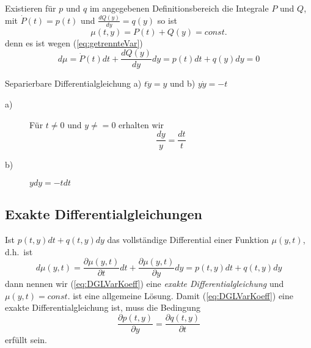 Existieren für $p$ und $q$ im angegebenen Definitionsbereich die Integrale $P$
und $Q$, mit $\dot{P}(t)=p(t)$ und $\frac{dQ(y)}{dy}=q(y)$ so ist
\[\mu(t,y)=P(t)+Q(y)=const.\]
denn es ist wegen (\ref{eq:getrennteVar})
\[ d\mu=\dot{P}(t)dt+\frac{dQ(y)}{dy}dy=p(t)dt+q(y)dy=0\]
\begin{example}{Separierbare Differentialgleichung}
a) $t\dot{y}=y$ und b) $y\dot{y}=-t$
\begin{description}
  \item[a)] Für $t\ne 0$ und $y\ne =0$ erhalten wir 
  \[\frac{dy}{y}=\frac{dt}{t}\]
\item[b)] $ydy=-tdt$
\end{description}
\end{example}
\subsection{Exakte Differentialgleichungen}
Ist $p(t,y)dt+q(t,y)dy$ das vollständige Differential einer Funktion
$\mu(y,t)$, d.h.\ ist 
\[d\mu(y,t)=\frac{\partial\mu(y,t)}{\partial t}dt+
\frac{\partial\mu(y,t)}{\partial y}dy=p(t,y)dt+q(t,y)dy\]
dann nennen wir (\ref{eq:DGLVarKoeff}) eine {\it exakte Differentialgleichung}
und $\mu(y,t)=const.$ ist eine allgemeine Lösung. Damit (\ref{eq:DGLVarKoeff})
eine exakte Differentialgleichung ist, muss die Bedingung
\begin{equation}
  \frac{\partial p(t,y)}{\partial y}=  \frac{\partial q(t,y)}{\partial t}
  \label{eq:BedExaktheit}
\end{equation}
erfüllt sein.

